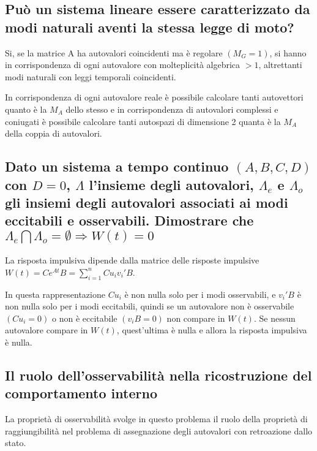 \documentclass{article}
\begin{document}
\subsection{Può un sistema lineare essere caratterizzato da modi naturali aventi la stessa legge di moto?}
Si, se la matrice A ha autovalori coincidenti ma è regolare $(M_G=1)$,
si hanno in corrispondenza di ogni autovalore con molteplicità algebrica $>1$,
altrettanti modi naturali con leggi temporali coincidenti.

In corrispondenza di ogni autovalore reale è possibile calcolare tanti autovettori quanto è la
$M_A$ dello stesso e in corrispondenza di autovalori complessi e coniugati
è possibile calcolare tanti autospazi di dimensione 2 quanta è la $M_A$
della coppia di autovalori.



\subsection{\boldmath Dato un sistema a tempo continuo $(A, B, C, D)$ con $D = 0$, $\Lambda$
l'insieme degli
autovalori, $\Lambda_e$ e $\Lambda_o$ gli insiemi degli autovalori associati ai modi eccitabili e
osservabili. Dimostrare che $\Lambda_e  \bigcap\Lambda_o = \emptyset \Longrightarrow W(t) = 0$}

La risposta impulsiva dipende dalla matrice delle risposte impulsive
\(\displaystyle W(t)=Ce^{At}B=\sum_{i=1}^{n}C u_i v_i' B\).

In questa rappresentazione $C u_i$ è non nulla solo per i modi osservabili,
e $v_i'B$ è non nulla solo per i modi eccitabili,
quindi se un autovalore non è osservabile $(Cu_i=0)$ o non è eccitabile $(v_iB=0)$
non compare in $W(t)$.
Se nessun autovalore compare in $W(t)$, quest'ultima è nulla e allora la risposta impulsiva è nulla.


\subsection{Il ruolo dell'osservabilità nella ricostruzione del comportamento interno}
La proprietà di osservabilità svolge in questo problema il
ruolo della proprietà di raggiungibilità nel problema
di assegnazione degli autovalori con retroazione dallo stato.
\end{document}
